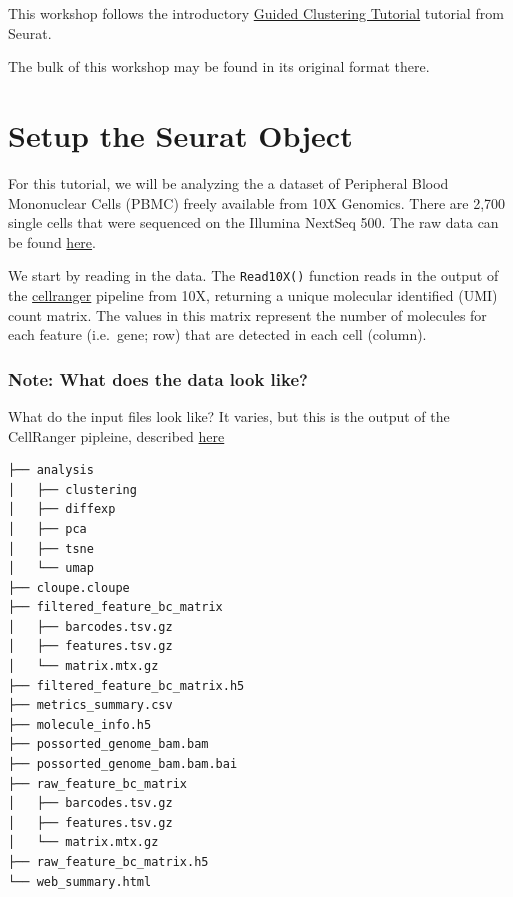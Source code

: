 \documentclass[
]{book}
\begin{document}
This workshop follows the introductory \href{https://satijalab.org/seurat/articles/pbmc3k_tutorial.html}{Guided Clustering Tutorial} tutorial from Seurat.

The bulk of this workshop may be found in its original format there.

\hypertarget{setup-the-seurat-object}{%
\section{Setup the Seurat Object}\label{setup-the-seurat-object}}

For this tutorial, we will be analyzing the a dataset of Peripheral Blood Mononuclear Cells (PBMC) freely available from 10X Genomics. There are 2,700 single cells that were sequenced on the Illumina NextSeq 500. The raw data can be found \href{https://cf.10xgenomics.com/samples/cell/pbmc3k/pbmc3k_filtered_gene_bc_matrices.tar.gz}{here}.

We start by reading in the data. The \texttt{Read10X()} function reads in the output of the \href{https://support.10xgenomics.com/single-cell-gene-expression/software/pipelines/latest/what-is-cell-ranger}{cellranger} pipeline from 10X, returning a unique molecular identified (UMI) count matrix. The values in this matrix represent the number of molecules for each feature (i.e.~gene; row) that are detected in each cell (column).

\hypertarget{note-what-does-the-data-look-like}{%
\subsubsection*{Note: What does the data look like?}\label{note-what-does-the-data-look-like}}

What do the input files look like? It varies, but this is the output of the CellRanger pipleine, described \href{https://support.10xgenomics.com/single-cell-gene-expression/software/pipelines/latest/output/gex-outputs}{here}

\begin{verbatim}
├── analysis
│   ├── clustering
│   ├── diffexp
│   ├── pca
│   ├── tsne
│   └── umap
├── cloupe.cloupe
├── filtered_feature_bc_matrix
│   ├── barcodes.tsv.gz
│   ├── features.tsv.gz
│   └── matrix.mtx.gz
├── filtered_feature_bc_matrix.h5
├── metrics_summary.csv
├── molecule_info.h5
├── possorted_genome_bam.bam
├── possorted_genome_bam.bam.bai
├── raw_feature_bc_matrix
│   ├── barcodes.tsv.gz
│   ├── features.tsv.gz
│   └── matrix.mtx.gz
├── raw_feature_bc_matrix.h5
└── web_summary.html
\end{verbatim}
\end{document}
